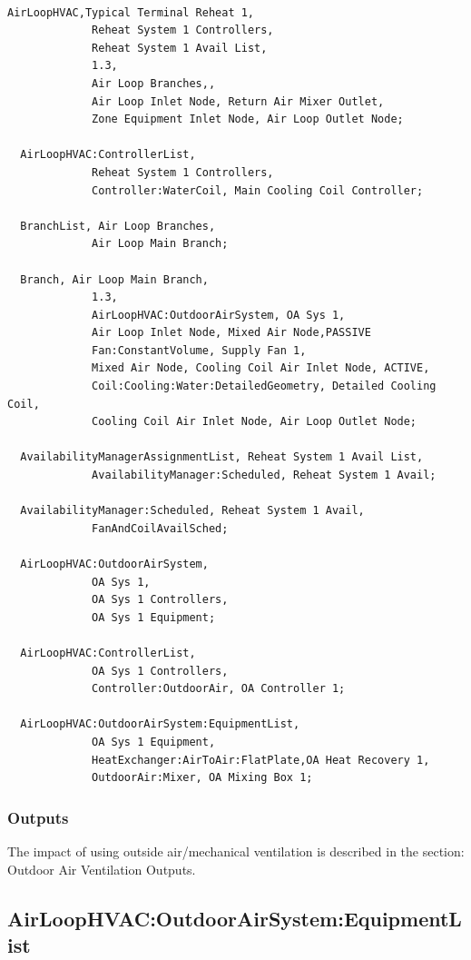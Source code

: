 \begin{lstlisting}

AirLoopHVAC,Typical Terminal Reheat 1,
             Reheat System 1 Controllers,
             Reheat System 1 Avail List,
             1.3,
             Air Loop Branches,,
             Air Loop Inlet Node, Return Air Mixer Outlet,
             Zone Equipment Inlet Node, Air Loop Outlet Node;

  AirLoopHVAC:ControllerList,
             Reheat System 1 Controllers,
             Controller:WaterCoil, Main Cooling Coil Controller;

  BranchList, Air Loop Branches,
             Air Loop Main Branch;

  Branch, Air Loop Main Branch,
             1.3,
             AirLoopHVAC:OutdoorAirSystem, OA Sys 1,
             Air Loop Inlet Node, Mixed Air Node,PASSIVE
             Fan:ConstantVolume, Supply Fan 1,
             Mixed Air Node, Cooling Coil Air Inlet Node, ACTIVE,
             Coil:Cooling:Water:DetailedGeometry, Detailed Cooling Coil,
             Cooling Coil Air Inlet Node, Air Loop Outlet Node;

  AvailabilityManagerAssignmentList, Reheat System 1 Avail List,
             AvailabilityManager:Scheduled, Reheat System 1 Avail;

  AvailabilityManager:Scheduled, Reheat System 1 Avail,
             FanAndCoilAvailSched;

  AirLoopHVAC:OutdoorAirSystem,
             OA Sys 1,
             OA Sys 1 Controllers,
             OA Sys 1 Equipment;

  AirLoopHVAC:ControllerList,
             OA Sys 1 Controllers,
             Controller:OutdoorAir, OA Controller 1;

  AirLoopHVAC:OutdoorAirSystem:EquipmentList,
             OA Sys 1 Equipment,
             HeatExchanger:AirToAir:FlatPlate,OA Heat Recovery 1,
             OutdoorAir:Mixer, OA Mixing Box 1;
\end{lstlisting}

\subsubsection{Outputs}\label{outputs-2-001}

The impact of using outside air/mechanical ventilation is described in the section: Outdoor Air Ventilation Outputs.

\subsection{AirLoopHVAC:OutdoorAirSystem:EquipmentList}\label{airloophvacoutdoorairsystemequipmentlist}

